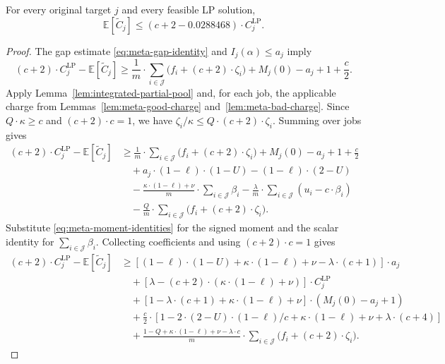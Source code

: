 \begin{lemma}
\label{thm:meta-symbolic}
For every original target $j$ and every feasible LP solution,
\[
 \mathbb E[\widetilde C_j]\le
 \left(c+2-0.0288468\right)\cdot C_j^{\mathrm{LP}}.
\]
\end{lemma}
\begin{proof}
The gap estimate \eqref{eq:meta-gap-identity} and $I_j(\alpha)\le a_j$ imply
\begin{equation}
 (c+2)\cdot C_j^{\mathrm{LP}}-\mathbb E[\widetilde C_j]
 \ge\frac1m\cdot\sum_{i\in\mathcal J}
       \bigl(f_i+(c+2)\cdot\zeta_i\bigr)
       +M_j(0)-a_j+1+\frac c2.
 \label{eq:meta-base-gap}
\end{equation}
Apply Lemma~\ref{lem:integrated-partial-pool} and, for each job, the applicable
charge from Lemmas~\ref{lem:meta-good-charge} and~\ref{lem:meta-bad-charge}.
Since $Q\cdot\kappa\ge c$ and $(c+2)\cdot c=1$, we have
$\zeta_i/\kappa\le Q\cdot(c+2)\cdot\zeta_i$. Summing over jobs gives
\begin{align*}
 (c+2)\cdot C_j^{\mathrm{LP}}-\mathbb E[\widetilde C_j]
 &\ge \frac1m\cdot\sum_{i\in\mathcal J}\bigl(f_i+(c+2)\cdot\zeta_i\bigr)
       +M_j(0)-a_j+1+\frac c2\\
 &\quad +a_j\cdot(1-\ell)\cdot(1-U)-(1-\ell)\cdot(2-U)\\
 &\quad -\frac{\kappa\cdot(1-\ell)+\nu}{m}\cdot\sum_{i\in\mathcal J}\beta_i
 -\frac{\lambda}{m}\cdot\sum_{i\in\mathcal J}(u_i-c\cdot\beta_i)\\
 &\quad -\frac Qm\cdot\sum_{i\in\mathcal J}\bigl(f_i+(c+2)\cdot\zeta_i\bigr).
\end{align*}
Substitute \eqref{eq:meta-moment-identities} for the signed moment and the
scalar identity for $\sum_{i\in\mathcal J}\beta_i$. 
Collecting coefficients and using $(c+2)\cdot c=1$ gives
\begin{align*}
 (c+2)\cdot C_j^{\mathrm{LP}}-\mathbb E[\widetilde C_j]
 &\ge [(1-\ell)\cdot(1-U)+\kappa\cdot(1-\ell)+\nu-\lambda\cdot(c+1)]\cdot a_j\\
 &\quad +[\lambda-(c+2)\cdot(\kappa\cdot(1-\ell)+\nu)]\cdot C_j^{\mathrm{LP}}\\
 &\quad +[1-\lambda\cdot(c+1)+\kappa\cdot(1-\ell)+\nu]\cdot(M_j(0)-a_j+1)\\
 &\quad +\frac c2\cdot[1-2\cdot(2-U)\cdot(1-\ell)/c+\kappa\cdot(1-\ell)+\nu+\lambda\cdot(c+4)]\\
 &\quad +\frac{1-Q+\kappa\cdot(1-\ell)+\nu-\lambda\cdot c}{m}\cdot
          \sum_{i\in\mathcal J}\bigl(f_i+(c+2)\cdot\zeta_i\bigr).

\end{align*}
\end{proof}
